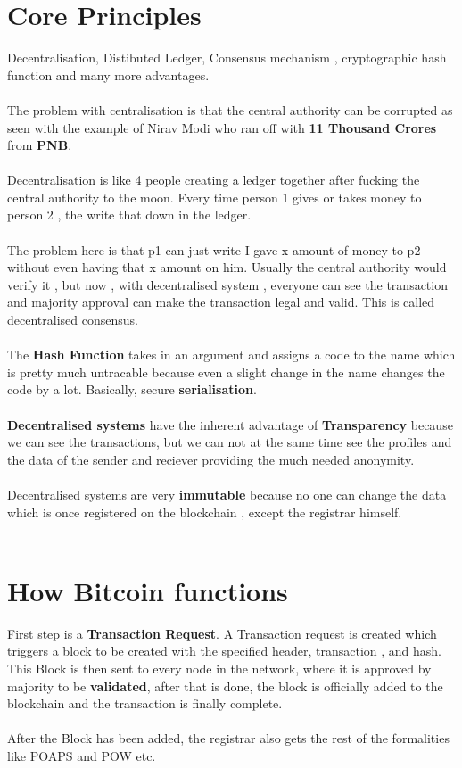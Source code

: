 \documentclass[a4paper,30pt]{report}
\begin{document}
	\section{Core Principles} Decentralisation, Distibuted Ledger, Consensus mechanism , cryptographic hash function and many more advantages.\\\\ 
        The problem with centralisation is that the central authority can be corrupted as seen with the example of Nirav Modi who ran off with \textbf{11 Thousand Crores} from \textbf{PNB}.\\\\ 
		Decentralisation is like 4 people creating a ledger together after fucking the central authority to the moon. Every time person 1 gives or takes money to person 2 , the write that down in the ledger.\\\\ 
		The problem here is that p1 can just write I gave x amount of money to p2 without even having that x amount on him. Usually the central authority would verify it , but now , with decentralised system , everyone can see the transaction and majority approval can make the transaction legal and valid. This is called decentralised consensus.\\\\ 
        The \textbf{Hash Function} takes in an argument and assigns a code to the name which is pretty much untracable because even a slight change in the name changes the code by a lot. Basically, secure \textbf{serialisation}.\\\\ 
        \textbf{Decentralised systems} have the inherent advantage of \textbf{Transparency} because we can see the transactions, but we can not at the same time see the profiles and the data of the sender and reciever providing the much needed anonymity.\\\\ 
        Decentralised systems are very \textbf{immutable} because no one can change the data which is once registered on the blockchain , except the registrar himself.\\\\


      \section{How Bitcoin functions}
          First step is a \textbf{Transaction Request}. A Transaction request is created which triggers a block to be created with the specified header, transaction , and hash. This Block is then sent to every node in the network, where it is approved by majority to be \textbf{validated}, after that is done, the block is officially added to the blockchain and the transaction is finally complete.\\\\
          After the Block has been added, the registrar also gets the rest of the formalities like POAPS and POW etc.\\
\end{document}
